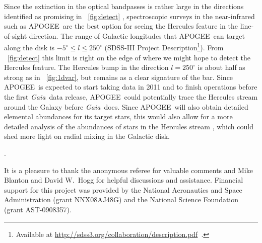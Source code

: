 \documentclass[12pt,preprint]{aastex}
\newcommand{\eg}{e.g.}
\newcommand{\Gaia}{\emph{Gaia}}
\newcommand{\apogee}{APOGEE}
\begin{document}
Since the extinction in the optical bandpasses is rather large in the
directions identified as promising in \figurename~\ref{fig:detect}
\citep[$A_V \approx 8$ mag toward $l \approx
  270^{\circ}$;][]{marshall06a}, spectroscopic surveys in the
near-infrared such as \apogee\ are the best option for seeing the
Hercules feature in the line-of-sight direction. The range of Galactic
longitudes that \apogee\ can target along the disk is $-5^{\circ} \leq
l \leq 250^{\circ}$ (SDSS-III Project Description\footnote{Available
  at \url{http://sdss3.org/collaboration/description.pdf}~.}). From
\figurename~\ref{fig:detect} this limit is right on the edge of where
we might hope to detect the Hercules feature. The Hercules bump in the
direction $l = 250^{\circ}$ is about half as strong as in
\figurename~\ref{fig:1dvar}, but remains as a clear signature of the
bar. Since \apogee\ is expected to start taking data in 2011 and to
finish operations before the first \Gaia\ data release, \apogee\ could
potentially trace the Hercules stream around the Galaxy before
\Gaia\ does. Since \apogee\ will also obtain detailed elemental
abundances for its target stars, this would also allow for a more
detailed analysis of the abundances of stars in the Hercules stream
\citep[following, \eg,][]{Bensby07a,Bovy10a}, which could shed more
light on radial mixing in the Galactic disk.

\citep{Freeman10a}.

\acknowledgements It is a pleasure to thank the anonymous referee for
valuable comments and Mike Blanton and David W.~Hogg for helpful
discussions and assistance.  Financial support for this project was
provided by the National Aeronautics and Space Administration (grant
NNX08AJ48G) and the National Science Foundation (grant AST-0908357).
\end{document}
